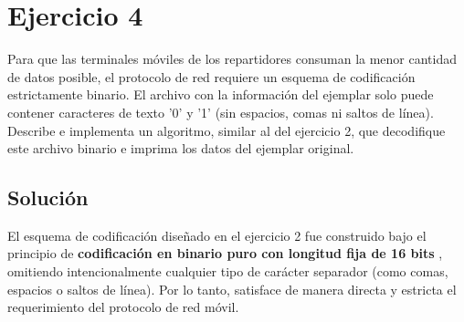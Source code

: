 \section{Ejercicio 4}

\begin{tcolorbox}[enunciado]
Para que las terminales móviles de los repartidores consuman la menor cantidad de datos posible, el protocolo de red requiere un esquema de codificación estrictamente binario. El archivo con la información del ejemplar solo puede contener caracteres de texto '0' y '1' (sin espacios, comas ni saltos de línea). Describe e implementa un algoritmo, similar al del ejercicio 2, que decodifique este archivo binario e imprima los datos del ejemplar original.
\end{tcolorbox}

\subsection{Solución}

El esquema de codificación diseñado en el ejercicio 2 fue construido bajo el principio de \textbf{codificación en binario puro con longitud fija de 16 bits }, omitiendo intencionalmente cualquier tipo de carácter separador (como comas, espacios o saltos de línea). Por lo tanto, satisface de manera directa y estricta el requerimiento del protocolo de red móvil.
